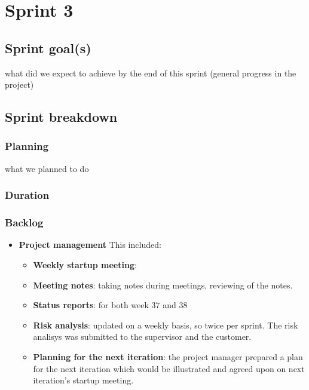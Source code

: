 

\chapter{Sprint 3}
\label{Sprint0}

\section{Sprint goal(s)}
what did we expect to achieve by the end of this sprint (general progress in the project)
\section{Sprint breakdown}
\subsection{Planning}
what we planned to do
\subsection{Duration}
\subsection{Backlog}


\begin{itemize}
\item \textbf{Project management}\newline
	This included:
	\begin{itemize}
		\item \textbf{Weekly startup meeting}: 
		\item \textbf{Meeting notes}:
			taking notes during meetings, reviewing of the notes.
		\item \textbf{Status reports}:
			for both week 37 and 38
		\item \textbf{Risk analysis}:
			updated on a weekly basis, so twice per sprint.
			The risk analisys was submitted to the supervisor and the customer.
		\item \textbf{Planning for the next iteration}:
			the project manager prepared a plan for the next iteration
			which would be illustrated and agreed upon on next iteration's startup meeting.
	\end{itemize}
	
\end{itemize}



